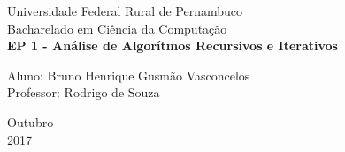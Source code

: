\documentclass[a4paper, 12pt]{article}
\begin{document}

\begin{titlepage}
	\begin{center}
	

		\Huge{Universidade Federal Rural de Pernambuco}\\
		\large{Bacharelado em Ciência da Computação}\\ 
		\vspace{15pt}
        \vspace{95pt}
        \textbf{\LARGE{EP 1 -  Análise de Algorítmos Recursivos e Iterativos}}\\
		\vspace{3,5cm}
	\end{center}
	
	\begin{flushleft}
		\begin{tabbing}
			Aluno: Bruno Henrique Gusmão Vasconcelos \\
			Professor: Rodrigo de Souza \\
	\end{tabbing}
 \end{flushleft}
	\vspace{1cm}
	
	\begin{center}
		\vspace{\fill}
			 Outubro\\
		 2017
			\end{center}
\end{titlepage}

\end{document}
